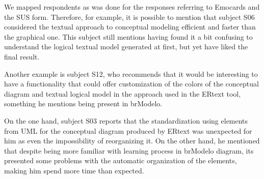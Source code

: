 We mapped respondents as was done for the responses referring to Emocards and the SUS form.
Therefore, for example, it is possible to mention that subject S06 considered the textual approach to conceptual modeling efficient and faster than the graphical one.
This subject still mentions having found it a bit confusing to understand the logical textual model generated at first, but yet have liked the final result.

Another example is subject S12, who recommends that it would be interesting to have a functionality that could offer customization of the colors of the conceptual diagram and textual logical model in the approach used in the ERtext tool, something he mentions being present in brModelo.

On the one hand, subject S03 reports that the standardization using elements from UML for the conceptual diagram produced by ERtext was unexpected for him as even the impossibility of reorganizing it.
On the other hand, he mentioned that despite being more familiar with learning process in brModelo diagram, its presented some problems with the automatic organization of the elements, making him spend more time than expected.

